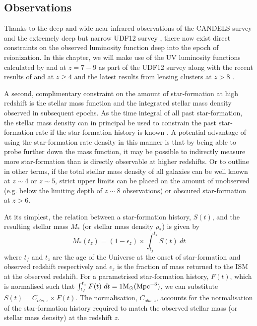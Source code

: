 \subsection{Observations}\label{reion-sec:observations}
Thanks to the deep and wide near-infrared observations of the CANDELS survey \citep{2011ApJS..197...35G,Koekemoer:2011br} and the extremely deep but narrow UDF12 survey \citep{Koekemoer:2013db}, there now exist direct constraints on the observed luminosity function deep into the epoch of reionization. In this chapter, we will make use of the UV luminosity functions calculated by \citet{McLure:2013hh} and \citet{Schenker:2013cl} at $z = 7 - 9$ as part of the UDF12 survey along with the recent results of \citet{2015ApJ...803...34B} and \citep{Finkelstein:2014ub} at $z \geq 4$ and the latest results from lensing clusters at $z >8$ \citep{Oesch:2014cs,McLeod:2014wz}.

A second, complimentary constraint on the amount of star-formation at high redshift is the stellar mass function and the integrated stellar mass density observed in subsequent epochs. As the time integral of all past star-formation, the stellar mass density can in principal be used to constrain the past star-formation rate if the star-formation history is known \citep{Stark:2007gi}.
A potential advantage of using the star-formation rate density in this manner is that by being able to probe further down the mass function, it may be possible to indirectly measure more star-formation than is directly observable at higher redshifts. Or to outline in other terms, if the total stellar mass density of all galaxies can be well known at $z\sim4$ or $z\sim5$, strict upper limits can be placed on the amount of unobserved (e.g. below the limiting depth of $z\sim8$ observations) or obscured star-formation at $z>6$.

At its simplest, the relation between a star-formation history, $S(t)$, and the resulting stellar mass  $M_{*}$ (or stellar mass density $\rho_{*}$) is given by
\begin{equation}
    M_{*}(t_{z}) = (1 - \epsilon_{z}) \times  \int_{t_{f}}^{t_{z}} S(t)~dt
\end{equation}
where $t_f$ and $t_z$ are the age of the Universe at the onset of star-formation and observed redshift respectively and $\epsilon_{z}$ is the fraction of mass returned to the ISM at the observed redshift. For a parametrised star-formation history, $F(t)$, which is normalised such that \( \int_{t_{f}}^{t_{z}} F(t)~dt = 1 \rm{M}_{\odot} (\rm{Mpc}^{-3}) \), we can substitute $S(t) = C_{obs,z}\times F(t)$. The normalisation, $C_{obs,z}$, accounts for the normalisation of the star-formation history required to match the observed stellar mass (or stellar mass density) at the redshift $z$. 

